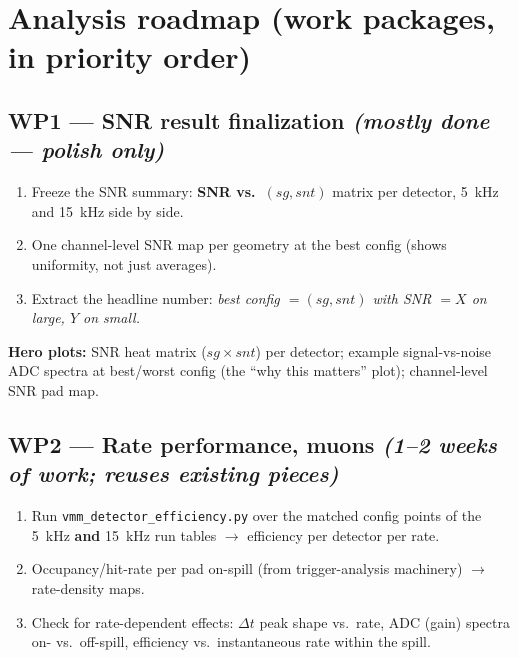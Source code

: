\documentclass[11pt,a4paper]{article}
\newcommand{\code}[1]{\texttt{#1}}
\begin{document}
\section{Analysis roadmap (work packages, in priority order)}

\subsection*{WP1 --- SNR result finalization \emph{(mostly done --- polish only)}}

\begin{enumerate}[itemsep=1pt]
  \item Freeze the SNR summary: \textbf{SNR vs.\ $(sg, snt)$} matrix per
    detector, 5~kHz and 15~kHz side by side.
  \item One channel-level SNR map per geometry at the best config (shows
    uniformity, not just averages).
  \item Extract the headline number: \emph{best config $= (sg, snt)$ with
    SNR $= X$ on large, $Y$ on small.}
\end{enumerate}

\textbf{Hero plots:} SNR heat matrix ($sg \times snt$) per detector; example
signal-vs-noise ADC spectra at best/worst config (the ``why this matters''
plot); channel-level SNR pad map.

\subsection*{WP2 --- Rate performance, muons \emph{(1--2 weeks of work; reuses existing pieces)}}

\begin{enumerate}[itemsep=1pt]
  \item Run \code{vmm\_detector\_efficiency.py} over the matched config points
    of the 5~kHz \textbf{and} 15~kHz run tables $\rightarrow$ efficiency per
    detector per rate.
  \item Occupancy/hit-rate per pad on-spill (from trigger-analysis machinery)
    $\rightarrow$ rate-density maps.
  \item Check for rate-dependent effects: $\Delta t$ peak shape vs.\ rate, ADC
    (gain) spectra on- vs.\ off-spill, efficiency vs.\ instantaneous rate
    within the spill.
\end{enumerate}
\end{document}
